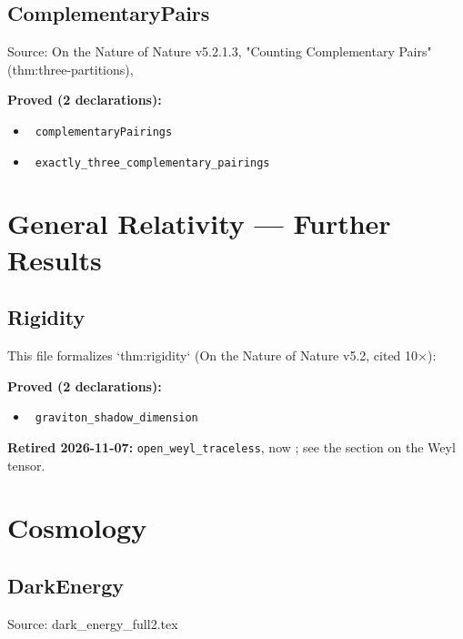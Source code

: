 \documentclass{report}
\theoremstyle{definition}
\begin{document}
\begin{itemize}
\begin{itemize}
\subsection{ComplementaryPairs}
Source: On the Nature of Nature v5.2.1.3, "Counting Complementary Pairs" (thm:three-partitions),

\noindent\textbf{Proved (2 declarations):}
\begin{itemize}
  \item {}\leanok\ \texttt{complementaryPairings}
  \item {}\leanok\ \texttt{exactly\_three\_complementary\_pairings}
\end{itemize}

\section{General Relativity --- Further Results}

\subsection{Rigidity}
This file formalizes `thm:rigidity` (On the Nature of Nature v5.2, cited 10×):

\noindent\textbf{Proved (2 declarations):}
\begin{itemize}
  \item {}\leanok\ \texttt{graviton\_shadow\_dimension}
\end{itemize}
\noindent\textbf{Retired 2026-11-07:} \texttt{open\_weyl\_traceless}, now \leanok; see the section on the Weyl tensor.

\section{Cosmology}

\subsection{DarkEnergy}
Source: dark\_energy\_full2.tex


\end{itemize}
\end{itemize}
\end{document}

